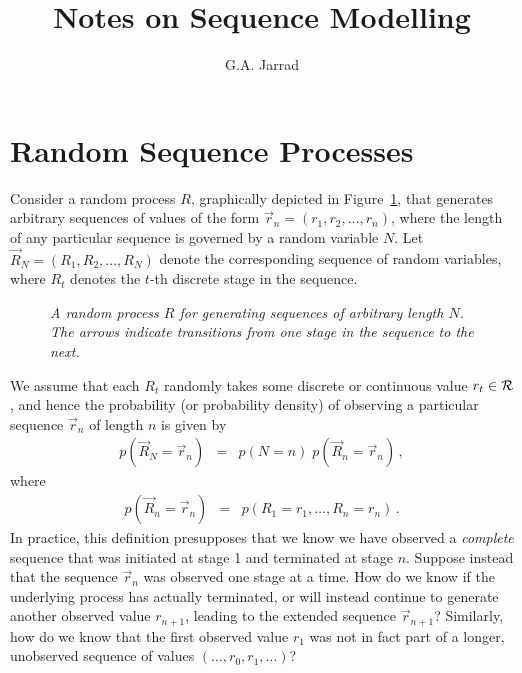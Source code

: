 \documentclass[a4paper]{article}
\title{Notes on Sequence Modelling}
\author{G.A. Jarrad}
\begin{document}
\maketitle
{}
\section{Random Sequence Processes}
\label{sec:random-processes}
Consider a random process $R$, graphically depicted in Figure~\ref{fig:R-process}, that generates arbitrary sequences of values
of the form $\vec{r}_n=(r_1,r_2,\ldots,r_n)$, where the length of any particular sequence is 
governed by a random variable $N$. Let $\vec{R}_N=(R_1,R_2,\ldots,R_N)$ denote
the corresponding sequence of random variables, where $R_t$ denotes the $t$-th discrete stage in the sequence.
\begin{figure}[hbt]
\centering
{}
\caption{\em A random process $R$ for generating sequences of arbitrary length $N$. The arrows indicate transitions from one stage in the sequence to the next.}
\label{fig:R-process}
\end{figure}

We assume that each $R_t$ randomly takes some discrete or continuous value $r_t\in{\cal R}$,
and hence the probability (or probability density) of observing a particular
sequence $\vec{r}_n$ of length $n$ is given by
\begin{eqnarray}
   p(\vec{R}_N\!=\!\vec{r}_n) & = & p(N=n)\; p(\vec{R}_n\!=\!\vec{r}_n)\,,
\end{eqnarray}
where
\begin{eqnarray}
p(\vec{R}_n\!=\!\vec{r}_n) & = & p(R_1\!=\!r_1,\ldots,R_n\!=\!r_n)\,.
\end{eqnarray}
In practice, this definition presupposes that we know we have observed a {\em complete} sequence that was initiated
at stage 1 and terminated at stage $n$.
Suppose instead that the sequence $\vec{r}_n$ was observed one stage at a time. How do we know if the
underlying process has actually terminated, or will instead
continue to generate another observed value
$r_{n+1}$, leading to the extended sequence $\vec{r}_{n+1}$? 
Similarly, how do we know that the first observed value $r_1$ was not in fact
part of a longer, unobserved sequence of values $(\ldots,r_0,r_1,\ldots)$?
\end{document}
